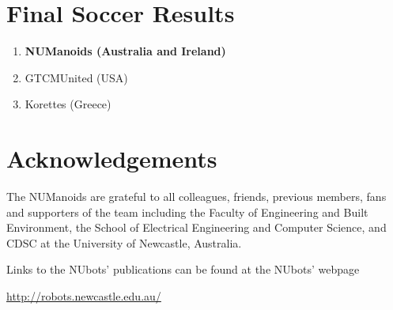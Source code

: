 \section{Final Soccer Results}

\begin{enumerate}
    \item \textbf{NUManoids (Australia and Ireland)}
    \item GTCMUnited (USA)
    \item Korettes (Greece)
\end{enumerate}
\section{Acknowledgements}
 \noindent The NUManoids are grateful to all colleagues,
friends, previous members, fans and supporters of the team including  the Faculty of Engineering and Built Environment, the School of Electrical Engineering and Computer Science, and CDSC at the University of Newcastle, Australia.

\noindent Links to the NUbots' publications can be found at the
NUbots' webpage
\begin{center}
\url{http://robots.newcastle.edu.au/}
\end{center}
